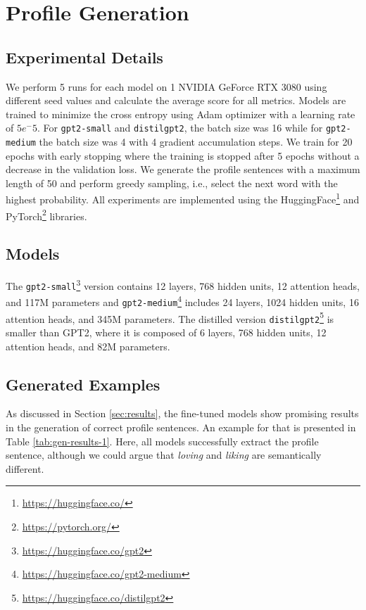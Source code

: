 \documentclass[11pt]{article}
\begin{document}
\section{Profile Generation}


\subsection{Experimental Details}
\label{appendix:generation-details}

We perform 5 runs for each model on 1 NVIDIA GeForce RTX 3080 using different seed values and calculate the average score for all metrics.
Models are trained to minimize the cross entropy using Adam \cite{ADAM} optimizer with a learning rate of \(5e^-5\).
For \texttt{gpt2-small} and \texttt{distilgpt2}, the batch size was 16 while for \texttt{gpt2-medium} the batch size was 4 with 4 gradient accumulation steps.
We train for 20 epochs with early stopping where the training is stopped after 5 epochs without a decrease in the validation loss.
We generate the profile sentences with a maximum length of 50 and perform greedy sampling, i.e., select the next word with the highest probability.
All experiments are implemented using the HuggingFace\footnote{\href{https://huggingface.co/}{https://huggingface.co/}} and PyTorch\footnote{\href{https://pytorch.org/}{https://pytorch.org/}} libraries.

\subsection{Models}
\label{appendix:models}
The \texttt{gpt2-small}\footnote{\href{https://huggingface.co/gpt2}{https://huggingface.co/gpt2}} version contains 12 layers, 768 hidden units, 12 attention heads, and 117M parameters and \texttt{gpt2-medium}\footnote{\href{https://huggingface.co/gpt2-medium}{https://huggingface.co/gpt2-medium}} includes 24 layers, 1024 hidden units, 16 attention heads, and 345M parameters.
The distilled version \texttt{distilgpt2}\footnote{\href{https://huggingface.co/distilgpt2}{https://huggingface.co/distilgpt2}} \cite{DISTIL} is smaller than GPT2, where it is composed of 6 layers, 768 hidden units, 12 attention heads, and 82M parameters.

\subsection{Generated Examples}
\label{appendix:gen-examples}

As discussed in Section \ref{sec:results}, the fine-tuned models show promising results in the generation of correct profile sentences.
An example for that is presented in Table \ref{tab:gen-results-1}.
Here, all models successfully extract the profile sentence, although we could argue that \textit{loving} and \textit{liking} are semantically different.
\end{document}
